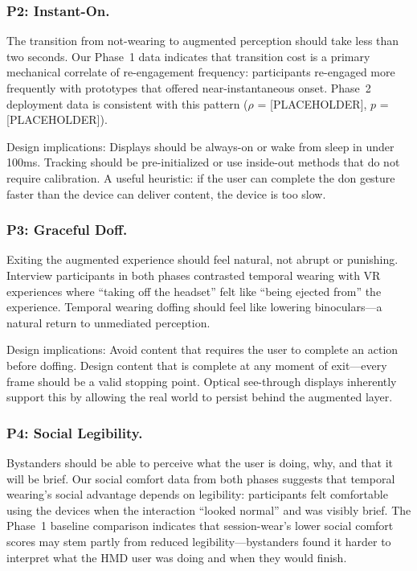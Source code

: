 \subsubsection{P2: Instant-On.}
The transition from not-wearing to augmented perception should take less than two seconds. Our Phase~1 data indicates that transition cost is a primary mechanical correlate of re-engagement frequency: participants re-engaged more frequently with prototypes that offered near-instantaneous onset. Phase~2 deployment data is consistent with this pattern ($\rho$ = [PLACEHOLDER], $p$ = [PLACEHOLDER]).

Design implications: Displays should be always-on or wake from sleep in under 100ms. Tracking should be pre-initialized or use inside-out methods that do not require calibration. A useful heuristic: if the user can complete the don gesture faster than the device can deliver content, the device is too slow.

\subsubsection{P3: Graceful Doff.}
Exiting the augmented experience should feel natural, not abrupt or punishing. Interview participants in both phases contrasted temporal wearing with VR experiences where ``taking off the headset'' felt like ``being ejected from'' the experience. Temporal wearing doffing should feel like lowering binoculars---a natural return to unmediated perception.

Design implications: Avoid content that requires the user to complete an action before doffing. Design content that is complete at any moment of exit---every frame should be a valid stopping point. Optical see-through displays inherently support this by allowing the real world to persist behind the augmented layer.

\subsubsection{P4: Social Legibility.}
Bystanders should be able to perceive what the user is doing, why, and that it will be brief. Our social comfort data from both phases suggests that temporal wearing's social advantage depends on legibility: participants felt comfortable using the devices when the interaction ``looked normal'' and was visibly brief. The Phase~1 baseline comparison indicates that session-wear's lower social comfort scores may stem partly from reduced legibility---bystanders found it harder to interpret what the HMD user was doing and when they would finish.

